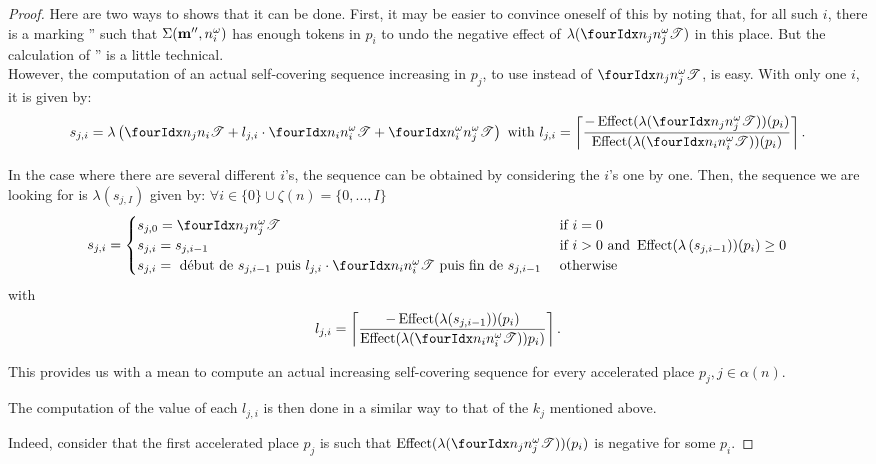 \begin{proof}
  Here are two ways to shows that it can be done.
  First, it may be easier to convince oneself of this by noting that, for all such $i$, there is a marking \mar'' such that $\Sigma(\mathbf{m}'', n^\omega_i)$ has enough tokens in $p_i$ to undo the negative effect of $\lambda(\treepath[n_j]{n^\omega_j})$ in this place. But the calculation of \mar'' is a little technical.\\
   However, the computation of an actual self-covering sequence increasing in $p_j$, to use instead of $\treepath[n_j]{ n^\omega_j}$, is easy. With only one $i$, it is given by:
   \[
     s_{j,i} = \lambda\left(\treepath[n_j]{n_i} + l_{j,i} \cdot \treepath[n_i]{n^\omega_i} + \treepath[n^\omega_i]{n^\omega_j}\right)
    \text{ with } l_{j,i} =
    \left\lceil \frac{-\effect{\lambda(\treepath[n_j]{n^\omega_j})}(p_i)}
                     { \effect{\lambda(\treepath[n_i]{n^\omega_i})}(p_i)} \right\rceil \text{.}\]

  In the case where there are several different $i$'s, the sequence can be obtained by considering the $i$'s one by one. Then, the sequence we are looking for is $\lambda\left(s_{j,I}\right)$ given by: $\forall i \in \{0\} \cup \zeta(n) = \{0, ..., I\}$
  \[
    s_{j,i} =
    \begin{cases}
      s_{j,0} = \treepath[n_j]{n^\omega_j}
        &\text{ if } i = 0 \\
      s_{j,i} = s_{j,i-1}
        &\text{ if } i > 0 \text{ and } \effect{\lambda\left(s_{j,i-1}\right)}(p_i) \geq 0 \\
      s_{j,i} = \text{ début de } s_{j,i-1} \text{ puis } l_{j,i} \cdot \treepath[n_i]{n^\omega_i} \text{ puis fin de } s_{j,i-1}
        &\text{ otherwise}
    \end{cases}
  \]
  with
  \[
    l_{j,i} = 
    \left\lceil \frac{-\effect{\lambda(s_{j,i-1})}(p_i)}
                     { \effect{\lambda(\treepath[n_i]{n^\omega_i})}p_i)} \right\rceil \text{.}
  \]

  This provides us with a mean to compute an actual increasing self-covering sequence for every accelerated place $p_j, j \in \alpha(n)$.

  The computation of the value of each $l_{j,i}$ is then done in a similar way to that of the $k_j$ mentioned above.

  Indeed, consider that the first accelerated place $p_j$ is such that $\effect{\lambda(\treepath[n_j]{n^\omega_j})}(p_i)$ is negative for some $p_i$.




\end{proof}
